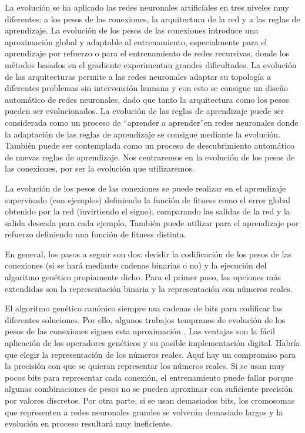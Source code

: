 \documentclass[a4paper,11pt]{article}
\begin{document}
 La evoluci\'on se ha aplicado las redes neuronales artificiales en tres niveles muy diferentes: a los pesos de las conexiones, la arquitectura de la red y a las reglas de aprendizaje. La evoluci\'on de los pesos de las conexiones introduce una aproximaci\'on global y adaptable al entrenamiento, especialmente para el aprendizaje por refuerzo o para el entrenamiento de redes recursivas, donde los m\'etodos basados en el gradiente experimentan grandes dificultades. La evoluci\'on de las arquitecturas permite a las redes neuronales adaptar su topolog\'ia a diferentes problemas sin intervenci\'on humana y con esto se consigue un dise\~no autom\'atico de redes neuronales, dado que tanto la arquitectura como los pesos pueden ser evolucionados. La evoluci\'on de las reglas de aprendizaje puede ser considerada como un proceso de \textquotedblleft aprender a aprender\textquotedblright en redes neuronales donde la adaptaci\'on de las reglas de aprendizaje se consigue mediante la evoluci\'on. Tambi\'en puede ser contemplada como un proceso de descubrimiento autom\'atico de nuevas reglas de aprendizaje. Nos centraremos en la evoluci\'on de los pesos de las conexiones, por ser la evoluci\'on que utilizaremos.

 La evoluci\'on de los pesos de las conexiones se puede realizar en el aprendizaje supervisado (con ejemplos) definiendo la funci\'on de fitness como el error global obtenido por la red (invirtiendo el signo), comparando las salidas de la red y la salida deseada para cada ejemplo. Tambi\'en puede utilizar para el aprendizaje por refuerzo definiendo una funci\'on de fitness distinta.

 En general, los pasos a seguir son dos: decidir la codificaci\'on de los pesos de las conexiones (si se har\'a mediante cadenas binarias o no) y la ejecuci\'on del algoritmo gen\'etico propiamente dicho. Para el primer paso, las opciones m\'as extendidas son la representaci\'on binaria y la representaci\'on con n\'umeros reales.

   El algoritmo gen\'etico can\'onico siempre usa cadenas de bits para codificar las diferentes soluciones. Por ello, algunos trabajos tempranos de evoluci\'on de los pesos de las conexiones siguen esta aproximaci\'on \cite[Yao99]{Yao99}. Las ventajas son la f\'acil aplicaci\'on de los operadores gen\'eticos y su posible implementaci\'on digital. Habr\'ia que elegir la representaci\'on de los n\'umeros reales. Aqu\'i hay un compromiso para la precisi\'on con que se quieran representar los n\'umeros reales. Si se usan muy pocos bits para representar cada conexi\'on, el entrenamiento puede fallar porque algunas combinaciones de pesos no se pueden aproximar con suficiente precisi\'on por valores discretos. Por otra parte, si se usan demasiados bits, los cromosomas que representen a redes neuronales grandes se volver\'an demasiado largos y la evoluci\'on en proceso resultar\'a muy ineficiente.
\end{document}
